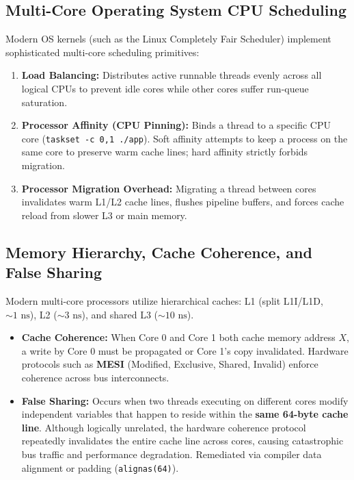 \subsection{Multi-Core Operating System CPU Scheduling}
Modern OS kernels (such as the Linux Completely Fair Scheduler) implement sophisticated multi-core scheduling primitives:
\begin{enumerate}
    \item \textbf{Load Balancing:} Distributes active runnable threads evenly across all logical CPUs to prevent idle cores while other cores suffer run-queue saturation.
    \item \textbf{Processor Affinity (CPU Pinning):} Binds a thread to a specific CPU core (\texttt{taskset -c 0,1 ./app}). Soft affinity attempts to keep a process on the same core to preserve warm cache lines; hard affinity strictly forbids migration.
    \item \textbf{Processor Migration Overhead:} Migrating a thread between cores invalidates warm L1/L2 cache lines, flushes pipeline buffers, and forces cache reload from slower L3 or main memory.
\end{enumerate}

\subsection{Memory Hierarchy, Cache Coherence, and False Sharing}
Modern multi-core processors utilize hierarchical caches: L1 (split L1I/L1D, $\sim 1\text{ ns}$), L2 ($\sim 3\text{ ns}$), and shared L3 ($\sim 10\text{ ns}$).
\begin{itemize}
    \item \textbf{Cache Coherence:} When Core 0 and Core 1 both cache memory address $X$, a write by Core 0 must be propagated or Core 1's copy invalidated. Hardware protocols such as \textbf{MESI} (Modified, Exclusive, Shared, Invalid) enforce coherence across bus interconnects.
    \item \textbf{False Sharing:} Occurs when two threads executing on different cores modify independent variables that happen to reside within the \textbf{same 64-byte cache line}. Although logically unrelated, the hardware coherence protocol repeatedly invalidates the entire cache line across cores, causing catastrophic bus traffic and performance degradation. Remediated via compiler data alignment or padding (\texttt{alignas(64)}).
\end{itemize}

